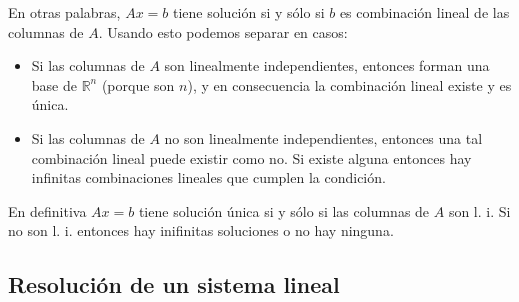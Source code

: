 En otras palabras, $Ax = b$ tiene solución si y sólo si $b$ es combinación lineal de las columnas de $A$. Usando esto podemos separar en casos:

\begin{itemize}
	\item Si las columnas de $A$ son linealmente independientes, entonces forman una base de $\mathbb{R}^n$ (porque son $n$), y en consecuencia la combinación lineal existe y es única.
	\item Si las columnas de $A$ no son linealmente independientes, entonces una tal combinación lineal puede existir como no. Si existe alguna entonces hay infinitas combinaciones lineales que cumplen la condición.
\end{itemize}

En definitiva $Ax = b$ tiene solución única si y sólo si las columnas de $A$ son l. i. Si no son l. i. entonces hay inifinitas soluciones o no hay ninguna.

\subsection{Resolución de un sistema lineal}

